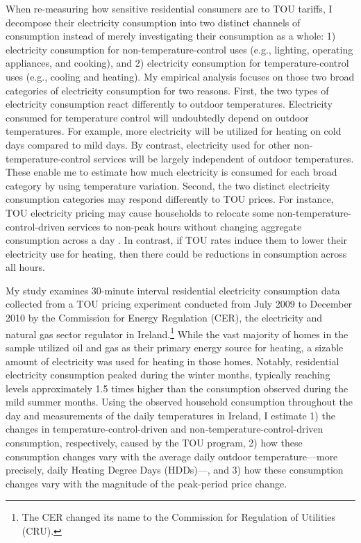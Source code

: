 When re-measuring how sensitive residential consumers are to TOU tariffs, I decompose their electricity consumption into two distinct channels of consumption instead of merely investigating their consumption as a whole: 1) electricity consumption for non-temperature-control uses (e.g., lighting, operating appliances, and cooking), and 2) electricity consumption for temperature-control uses (e.g., cooling and heating). My empirical analysis focuses on those two broad categories of electricity consumption for two reasons. First, the two types of electricity consumption react differently to outdoor temperatures. Electricity consumed for temperature control will undoubtedly depend on outdoor temperatures. For example, more electricity will be utilized for heating on cold days compared to mild days. By contrast, electricity used for other non-temperature-control services will be largely independent of outdoor temperatures. These enable me to estimate how much electricity is consumed for each broad category by using temperature variation. Second, the two distinct electricity consumption categories may respond differently to TOU prices. For instance, TOU electricity pricing may cause households to relocate some non-temperature-control-driven services to non-peak hours without changing aggregate consumption across a day \citep{Residential-Response-to-Critical-Peak-Pricing-of-Electricity_California-Evidence_Herter-and-Wayland_2010, Empowering-Consumers-through-Data-and-Smart-Technology_HML_2016}. In contrast, if TOU rates induce them to lower their electricity use for heating, then there could be reductions in consumption across all hours. 

My study examines 30-minute interval residential electricity consumption data collected from a TOU pricing experiment conducted from July 2009 to December 2010 by the Commission for Energy Regulation (CER), the electricity and natural gas sector regulator in Ireland.\footnote{The CER changed its name to the Commission for Regulation of Utilities (CRU).} While the vast majority of homes in the sample utilized oil and gas as their primary energy source for heating, a sizable amount of electricity was used for heating in those homes. Notably, residential electricity consumption peaked during the winter months, typically reaching levels approximately 1.5 times higher than the consumption observed during the mild summer months. Using the observed household consumption throughout the day and measurements of the daily temperatures in Ireland, I estimate 1) the changes in temperature-control-driven and non-temperature-control-driven consumption, respectively, caused by the TOU program, 2) how these consumption changes vary with the average daily outdoor temperature---more precisely, daily Heating Degree Days (HDDs)---, and 3) how these consumption changes vary with the magnitude of the peak-period price change.  

